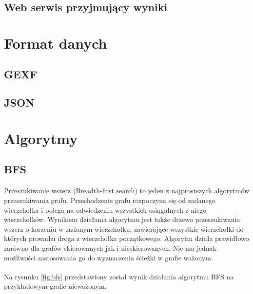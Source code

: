 \subsection{Web serwis przyjmujący wyniki}

\section{Format danych}
\label{sec:data}

\subsection{GEXF}

\subsection{JSON}

\section{Algorytmy}

\subsection{BFS}
\paragraph{}
Przeszukiwanie wszerz (Breadth-first search) to jeden z najprostszych algorytmów przeszukiwania grafu. 
Przechodzenie grafu rozpoczyna się od zadanego wierzchołka i polega na odwiedzeniu wszystkich osiągalnych z niego wierzchołków. 
Wynikiem działania algorytmu jest także drzewo przeszukiwania wszerz o korzeniu w zadanym wierzchołku, zawierające wszystkie wierzchołki do których
prowadzi droga z wierzchołka początkowego. 
Algorytm działa prawidłowo zarówno dla grafów skierowanych jak i nieskierowanych.
Nie ma jednak możliwości zastosowania go do wyznaczenia ścieżki w grafie ważonym.

\paragraph{}
Na rysunku \ref{fig:bfs} przedstawiony został wynik działania algorytmu BFS na przykładowym grafie nieważonym.

